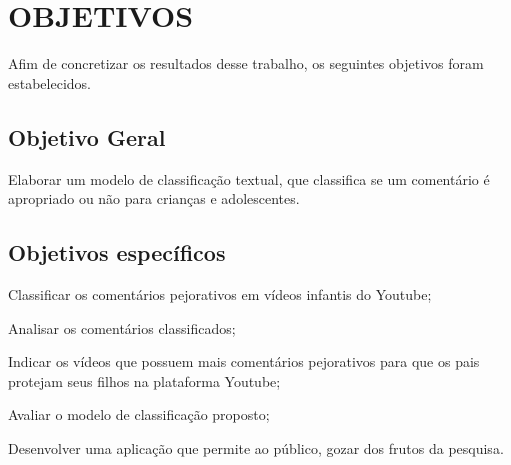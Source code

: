 \section{OBJETIVOS}

Afim de concretizar os resultados desse trabalho, os seguintes objetivos foram estabelecidos.

\subsection{Objetivo Geral}

Elaborar um modelo de classificação textual, que classifica se um comentário é apropriado ou não para crianças e adolescentes.

\begin{comment}
Example inline comment
\end{comment}

\subsection{Objetivos específicos}

\begin{alineas}
    
    \item Classificar os comentários pejorativos em vídeos infantis do Youtube;
    \item Analisar os comentários classificados;
    \item Indicar os vídeos que possuem mais comentários pejorativos para que os pais protejam seus filhos na plataforma Youtube; 
    \item Avaliar o modelo de classificação proposto;
    \item Desenvolver uma aplicação que permite ao público, gozar dos frutos da pesquisa.
    
\end{alineas}
